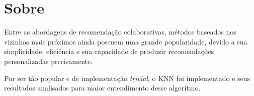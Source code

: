 \section{Sobre}
\par
Entre as abordagens de recomendação colaborativas, métodos baseados nos vizinhos mais próximos ainda possuem uma grande popularidade, devido a sua simplicidade, eficiência e sua capacidade de produzir recomendações personalizadas precisamente.
\par
Por ser tão popular e de implementação \textit{trivial}, o KNN foi implementado e seus resultados analisados para maior entendimento desse algoritmo.